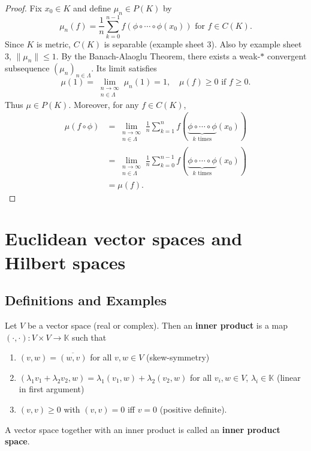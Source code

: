 \documentclass{article}
\newcommand{\K}{\mathbb{K}}
\begin{document}
\begin{proof}
    Fix $x_0 \in K$ and define $\mu_n \in P(K)$ by
    \begin{equation*}
        \mu_n(f) = \frac{1}{n} \sum_{k=0}^{n-1} f(\phi \circ \dotsb \circ \phi (x_0)) \text{ for } f \in C(K).
    \end{equation*}
    Since $K$ is metric, $C(K)$ is separable (example sheet 3). Also by example sheet 3, $\|\mu_n\| \leq 1$.
    By the Banach-Alaoglu Theorem, there exists a weak-$*$ convergent subsequence $(\mu_n)_{n \in \Lambda}$.
    Its limit satisfies
    \begin{equation*}
        \mu(1) = \lim_{\substack{n \to \infty \\ n \in \Lambda}} \mu_n(1) = 1, \quad \mu(f) \geq 0 \text{ if } f \geq 0.
    \end{equation*}
    Thus $\mu \in P(K)$. Moreover, for any $f \in C(K)$,
    \begin{align*}
        \mu(f \circ \phi) &= \lim_{\substack{n \to \infty \\ n \in \Lambda}} \frac{1}{n} \sum_{k=1}^n f(\underbrace{\phi \circ \dotsb \circ \phi}_{k \text{ times}} (x_0)) \\
                          &= \lim_{\substack{n \to \infty \\ n \in \Lambda}} \frac{1}{n} \sum_{k=0}^{n-1} f(\underbrace{\phi \circ \dotsb \circ \phi}_{k \text{ times}} (x_0)) \\
                          &= \mu(f).
    \end{align*}
\end{proof}

\clearpage
\section{Euclidean vector spaces and Hilbert spaces}
\subsection{Definitions and Examples}
\begin{defi}
    Let $V$ be a vector space (real or complex).
    Then an \textbf{inner product} is a map $(\cdot, \cdot): V \times V \to \K$ such that
    \begin{enumerate}[label=(\roman*)]
        \item $(v, w) = \overline{(w, v)}$ for all $v, w \in V$ (skew-symmetry)
        \item $(\lambda_1 v_1 + \lambda_2 v_2, w) = \lambda_1 (v_1, w) + \lambda_2(v_2, w)$ for all $v_i, w \in V$, $\lambda_i \in \K$ (linear in first argument)
        \item $(v, v) \geq 0$ with $(v,v) = 0$ iff $v = 0$ (positive definite).
    \end{enumerate}
    A vector space together with an inner product is called an \textbf{inner product space}.
\end{defi}
\end{document}
